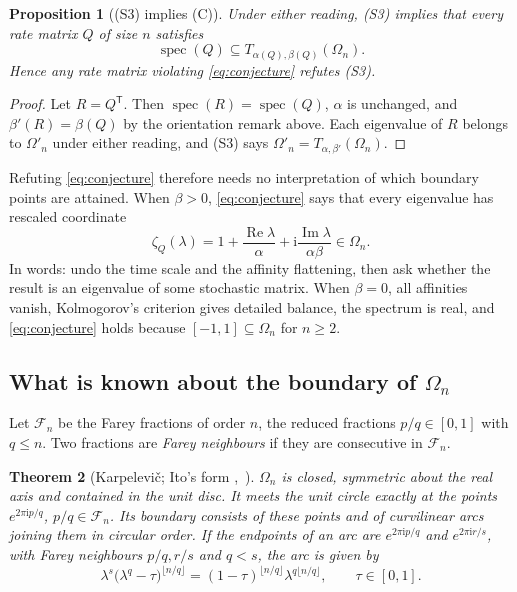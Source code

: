\documentclass[11pt,a4paper]{article}
\numberwithin{equation}{section}
\newtheorem{theorem}{Theorem}[section]
\newtheorem{proposition}[theorem]{Proposition}
\theoremstyle{definition}
\theoremstyle{remark}
\newcommand{\ii}{\mathrm{i}}
\newcommand{\spec}{\operatorname{spec}}
\newcommand{\Om}{\Omega}
\begin{document}
\begin{proposition}[(S3) implies (C)]
\label{prop:S3impliesC}
Under either reading, (S3) implies that every rate matrix \(Q\) of size
\(n\) satisfies
\begin{equation}
\spec(Q)\subseteq T_{\alpha(Q),\beta(Q)}(\Om_n).
\tag{C}\label{eq:conjecture}
\end{equation}
Hence any rate matrix violating \eqref{eq:conjecture} refutes (S3).
\end{proposition}

\begin{proof}
Let \(R=Q^{\mathsf T}\). Then \(\spec(R)=\spec(Q)\), \(\alpha\) is
unchanged, and \(\beta'(R)=\beta(Q)\) by the orientation remark above.
Each eigenvalue of \(R\) belongs to \(\Om'_n\) under either reading, and
(S3) says \(\Om'_n=T_{\alpha,\beta'}(\Om_n)\).
\end{proof}

Refuting \eqref{eq:conjecture} therefore needs no interpretation of
which boundary points are attained. When \(\beta>0\),
\eqref{eq:conjecture} says that every eigenvalue has rescaled
coordinate
\begin{equation}
\zeta_Q(\lambda)
 =1+\frac{\operatorname{Re}\lambda}{\alpha}
  +\ii\frac{\operatorname{Im}\lambda}{\alpha\beta}
 \in\Om_n.
\label{eq:inverse}
\end{equation}
In words: undo the time scale and the affinity flattening, then ask
whether the result is an eigenvalue of some stochastic matrix. When
\(\beta=0\), all affinities vanish, Kolmogorov's criterion gives
detailed balance, the spectrum is real, and \eqref{eq:conjecture} holds
because \([-1,1]\subseteq\Om_n\) for \(n\ge2\).

\subsection{What is known about the boundary of \texorpdfstring{\(\Om_n\)}{Omega n}}
\label{sec:karp}

Let \(\mathcal F_n\) be the Farey fractions of order \(n\), the reduced
fractions \(p/q\in[0,1]\) with \(q\le n\). Two fractions are
\emph{Farey neighbours} if they are consecutive in \(\mathcal F_n\).

\begin{theorem}[Karpelevi\v{c}; Ito's form {\cite{karpelevich1951,ito1997},\ \cite[Theorem~2.1]{johnson2017}}]
\label{thm:karp}
\(\Om_n\) is closed, symmetric about the real axis and contained in the
unit disc. It meets the unit circle exactly at the points
\(e^{2\pi\ii p/q}\), \(p/q\in\mathcal F_n\). Its boundary consists of
these points and of curvilinear arcs joining them in circular order.
If the endpoints of an arc are \(e^{2\pi\ii p/q}\) and
\(e^{2\pi\ii r/s}\), with Farey neighbours \(p/q,r/s\) and \(q<s\), the
arc is given by
\begin{equation}
\lambda^{s}\bigl(\lambda^{q}-\tau\bigr)^{\lfloor n/q\rfloor}
=(1-\tau)^{\lfloor n/q\rfloor}\lambda^{q\lfloor n/q\rfloor},
\qquad \tau\in[0,1].
\label{eq:ito_general}
\end{equation}
\end{theorem}
\end{document}
